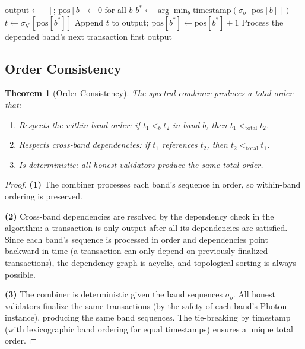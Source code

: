\documentclass[11pt,a4paper]{article}
\newtheorem{theorem}{Theorem}[section]
\begin{document}
\begin{algorithm}[H]
\caption{Spectral Combiner --- Deterministic Merge}
\label{alg:combiner}
\begin{algorithmic}[1]
    \State $\text{output} \gets []$; $\text{pos}[b] \gets 0$ for all $b$
        \State {}
        \State $b^* \gets \arg\min_b \text{timestamp}(\sigma_b[\text{pos}[b]])$
        \State $t \gets \sigma_{b^*}[\text{pos}[b^*]]$
        \State {}
            \State Append $t$ to output; $\text{pos}[b^*] \gets \text{pos}[b^*] + 1$
        \Else
            \State {}
            \State Process the depended band's next transaction first
        \EndIf
    \EndWhile
    \State \Return output
\EndFunction
\end{algorithmic}
\end{algorithm}

\subsection{Order Consistency}

\begin{theorem}[Order Consistency]
\label{thm:order}
The spectral combiner produces a total order that:
\begin{enumerate}[nosep]
\item Respects the within-band order: if $t_1 <_b t_2$ in band $b$, then $t_1 <_{\text{total}} t_2$.
\item Respects cross-band dependencies: if $t_1$ references $t_2$, then $t_2 <_{\text{total}} t_1$.
\item Is deterministic: all honest validators produce the same total order.
\end{enumerate}
\end{theorem}

\begin{proof}
\textbf{(1)} The combiner processes each band's sequence in order, so within-band
ordering is preserved.

\textbf{(2)} Cross-band dependencies are resolved by the dependency check in the
algorithm: a transaction is only output after all its dependencies are satisfied.
Since each band's sequence is processed in order and dependencies point backward in
time (a transaction can only depend on previously finalized transactions), the dependency
graph is acyclic, and topological sorting is always possible.

\textbf{(3)} The combiner is deterministic given the band sequences $\sigma_b$.
All honest validators finalize the same transactions (by the safety of each band's
Photon instance), producing the same band sequences. The tie-breaking by timestamp
(with lexicographic band ordering for equal timestamps) ensures a unique total order.
\end{proof}
\end{document}
